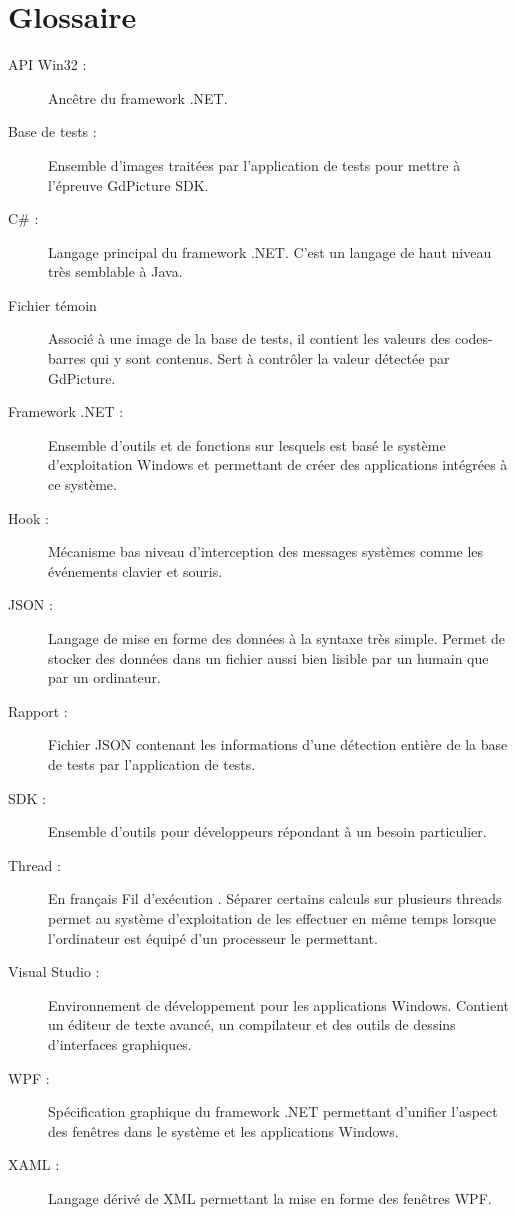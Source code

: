 \chapter*{Glossaire}

\begin{description}
\item[API Win32 :] Ancêtre du framework .NET.
\item[Base de tests :] Ensemble d'images traitées par l'application de tests pour mettre à l'épreuve GdPicture SDK.
\item[C# :] Langage principal du framework .NET. C'est un langage de haut niveau très semblable à Java.
\item[Fichier témoin ] Associé à une image de la base de tests, il contient les valeurs des codes-barres qui y sont contenus. Sert à contrôler la valeur détectée par GdPicture.
\item[Framework .NET :] Ensemble d'outils et de fonctions sur lesquels est basé le système d'exploitation Windows et permettant de créer des applications intégrées à ce système.
\item[Hook :] Mécanisme bas niveau d'interception des messages systèmes comme les événements clavier et souris.
\item[JSON :] Langage de mise en forme des données à la syntaxe très simple. Permet de stocker des données dans un fichier aussi bien lisible par un humain que par un ordinateur.
\item[Rapport :] Fichier JSON contenant les informations d'une détection entière de la base de tests par l'application de tests.
\item[SDK :] Ensemble d'outils pour développeurs répondant à un besoin particulier.
\item[Thread :] En français \og Fil d'exécution \fg{}. Séparer certains calculs sur plusieurs threads permet au système d'exploitation de les effectuer en même temps lorsque l'ordinateur est équipé d'un processeur le permettant.
\item[Visual Studio :] Environnement de développement pour les applications Windows. Contient un éditeur de texte avancé, un compilateur et des outils de dessins d'interfaces graphiques.
\item[WPF :] Spécification graphique du framework .NET permettant d'unifier l'aspect des fenêtres dans le système et les applications Windows.
\item[XAML :] Langage dérivé de XML permettant la mise en forme des fenêtres WPF.
\end{description}

